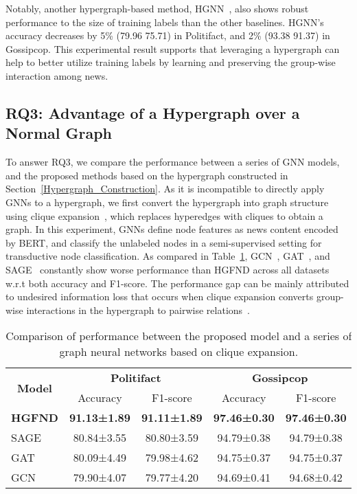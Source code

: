 \documentclass[conference]{IEEEtran}
\begin{document}
Notably, another hypergraph-based method, HGNN~\cite{feng2019hypergraph}, also shows robust performance to the size of training labels than the other baselines. HGNN's accuracy decreases by 5\% (79.96  75.71) in Politifact, and 2\% (93.38  91.37) in Gossipcop. This experimental result supports that leveraging a hypergraph can help to better utilize training labels by learning and preserving the group-wise interaction among news.

\subsection{RQ3: Advantage of a Hypergraph over a Normal Graph}


To answer RQ3, we compare the performance between a series of GNN models, and the proposed methods based on the hypergraph constructed in Section~\ref{Hypergraph_Construction}. As it is incompatible to directly apply GNNs to a hypergraph, we first convert the hypergraph into graph structure using clique expansion~\cite{zhou2006learning}, which replaces hyperedges with cliques to obtain a graph. In this experiment, GNNs define node features as news content encoded by BERT, and classify the unlabeled nodes in a semi-supervised setting for transductive node classification. As compared in Table~\ref{result_graph_hypergraph}, GCN~\cite{kipf2016semi}, GAT~\cite{velivckovic2017graph}, and SAGE~\cite{hamilton2017inductive} constantly show worse performance than HGFND across all datasets w.r.t both accuracy and F1-score. The performance gap can be mainly attributed to undesired information loss that occurs when clique expansion converts group-wise interactions in the hypergraph to pairwise relations~\cite{hein2013total}.

\begin{table}[!htbp]
\centering
\caption{Comparison of performance between the proposed model and a series of graph neural networks based on clique expansion.}\label{result_graph_hypergraph}
\begin{tabular}{lcccc}
\hline
\multicolumn{1}{c}{\multirow{2}{*}{\textbf{Model}}} & \multicolumn{2}{c}{\textbf{Politifact}}                        & \multicolumn{2}{c}{\textbf{Gossipcop}}                         \\ \cmidrule(l){2-3} \cmidrule(l){4-5} 
\multicolumn{1}{c}{}                        & \multicolumn{1}{c}{Accuracy} & \multicolumn{1}{c}{F1-score} & \multicolumn{1}{c}{Accuracy} & \multicolumn{1}{c}{F1-score} \\
\hline
\hline
\textbf{HGFND}& \textbf{91.13±1.89} & \textbf{91.11±1.89}& \textbf{97.46±0.30} & \textbf{97.46±0.30}\\
SAGE~\cite{hamilton2017inductive}             & 80.84±3.55 & 80.80±3.59& 94.79±0.38 & 94.79±0.38\\
GAT~\cite{velivckovic2017graph}             & 80.09±4.49 & 79.98±4.62& 94.75±0.37 & 94.75±0.37\\
GCN~\cite{kipf2016semi}             & 79.90±4.07 & 79.77±4.20&94.69±0.41 & 94.68±0.42 \\
\hline
\end{tabular}
\end{table}
\end{document}
